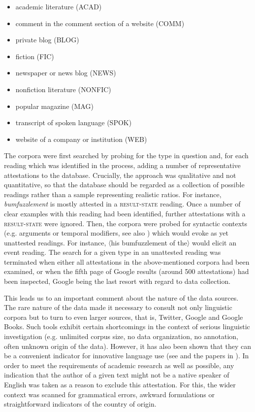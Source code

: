 \begin{itemize}
	\item academic literature (\acs{ACAD})
	\item comment in the comment section of a website (\acs{COMM})
	\item private blog (\acs{BLOG})
	\item fiction (\acs{FIC})
	\item newspaper or news blog (\acs{NEWS})
	\item nonfiction literature (\acs{NONFIC})
	\item popular magazine (\acs{MAG})
	\item transcript of spoken language (\acs{SPOK})
	\item website of a company or institution (\acs{WEB})
\end{itemize}

\noindent The corpora were first searched by probing for the type in question and, for each reading which was identified in the process, adding a number of representative attestations to the database. 
Crucially, the approach was qualitative and not quantitative, so that the database should be regarded as a collection of possible readings rather than a sample representing realistic ratios. 
For instance, \textit{bumfuzzlement} is mostly attested in a \textsc{result-state} reading. Once a number of clear examples with this reading had been identified, further attestations with a \textsc{result-state} were ignored. 
Then, the corpora were probed for syntactic contexts (e.g. arguments or temporal modifiers, see also \citealt{Lieber.2015}) which would evoke as yet unattested readings. For instance, 〈his bumfuzzlement of the〉 would elicit an event reading.  
The search for a given type in an unattested reading was terminated when either all attestations in the above-mentioned corpora had been examined, or when the fifth page of Google results (around 500 attestations) had been inspected, Google being the last resort with regard to data collection. 

This leads us to an important comment about the nature of the data sources. 
The rare nature of the data made it necessary to consult not only linguistic corpora but to turn to even larger sources, that is, Twitter, Google and Google Books.  
Such tools exhibit certain shortcomings in the context of serious linguistic investigation (e.g. unlimited corpus size, no data organization, no annotation, often unknown origin of the data). However, it has also been shown that they can be a convenient indicator for innovative language use (see \citealt{Diemer.2008} and the papers in \citealt{Hundt.2006}). In order to meet the requirements of academic research as well as possible, any indication that the author of a given text might not be a native speaker of English was taken as a reason to exclude this attestation. For this, the wider context was scanned for grammatical errors, awkward formulations or straightforward indicators of the country of origin.

